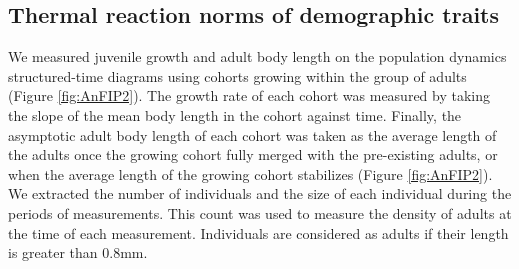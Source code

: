 \subsection{Thermal reaction norms of demographic traits}

We measured juvenile growth and adult body length on the population dynamics
structured-time diagrams using cohorts growing within the group of adults
(Figure \ref{fig:AnFIP2}). The growth rate of each cohort was measured by taking the slope
of the mean body length in the cohort against time. Finally, the asymptotic
adult body length of each cohort was taken as the average length of the adults
once the growing cohort fully merged with the pre-existing adults, or when the
average length of the growing cohort stabilizes (Figure \ref{fig:AnFIP2}). We
extracted the number of individuals and the size of each individual during the
periods of measurements. This count was used to measure the density of adults at
the time of each measurement. Individuals are considered as adults if their
length is greater than 0.8mm.

\newpage

